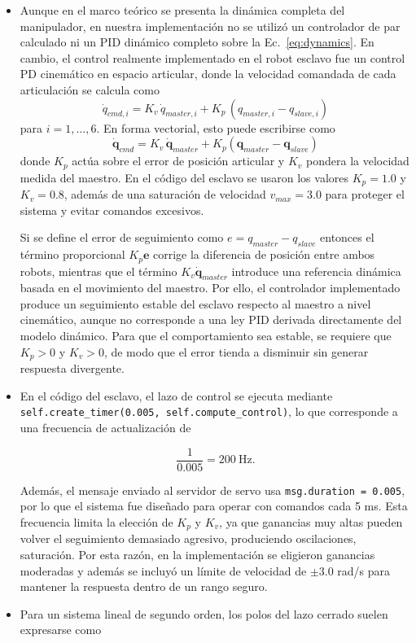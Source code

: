 \documentclass[journal,10pt,twoside]{IEEEtran}
\begin{document}
\begin{itemize}
  \item Aunque en el marco teórico se presenta la dinámica completa del manipulador, en nuestra implementación no se utilizó un controlador de par calculado ni un PID dinámico completo sobre la Ec.~\eqref{eq:dynamics}. En cambio, el control realmente implementado en el robot esclavo fue un control PD cinemático en espacio articular, donde la velocidad comandada de cada articulación se calcula como
  \[
    \dot{q}_{cmd,i}=K_v\,\dot{q}_{master,i}+K_p\,(q_{master,i}-q_{slave,i})
  \]
  para \(i=1,\dots,6\). En forma vectorial, esto puede escribirse como
  \[
    \dot{\bm{q}}_{cmd}=K_v\,\dot{\bm{q}}_{master}+K_p(\bm{q}_{master}-\bm{q}_{slave})
  \]
  donde \(K_p\) actúa sobre el error de posición articular y \(K_v\) pondera la velocidad medida del maestro. En el código del esclavo se usaron los valores \(K_p=1.0\) y \(K_v=0.8\), además de una saturación de velocidad \(v_{max}=3.0\) para proteger el sistema y evitar comandos excesivos.

  Si se define el error de seguimiento como $e=q_{master} - q_{slave}$ entonces el término proporcional \(K_p\bm{e}\) corrige la diferencia de posición entre ambos robots, mientras que el término \(K_v\dot{\bm{q}}_{master}\) introduce una referencia dinámica basada en el movimiento del maestro. Por ello, el controlador implementado produce un seguimiento estable del esclavo respecto al maestro a nivel cinemático, aunque no corresponde a una ley PID derivada directamente del modelo dinámico. Para que el comportamiento sea estable, se requiere que \(K_p>0\) y \(K_v>0\), de modo que el error tienda a disminuir sin generar respuesta divergente.
  \\
  \item En el código del esclavo, el lazo de control se ejecuta mediante
  \texttt{self.create\_timer(0.005, self.compute\_control)}, lo que corresponde a una frecuencia de actualización de

  \[
    \frac{1}{0.005}=200\ \text{Hz}.
  \]

  Además, el mensaje enviado al servidor de servo usa \texttt{msg.duration = 0.005}, por lo que el sistema fue diseñado para operar con comandos cada 5 ms. Esta frecuencia limita la elección de \(K_p\) y \(K_v\), ya que ganancias muy altas pueden volver el seguimiento demasiado agresivo, produciendo oscilaciones, saturación. Por esta razón, en la implementación se eligieron ganancias moderadas y además se incluyó un límite de velocidad de \(\pm 3.0\) rad/s para mantener la respuesta dentro de un rango seguro.
  \\
  \item Para un sistema lineal de segundo orden, los polos del lazo cerrado suelen expresarse como


\end{itemize}
\end{document}
